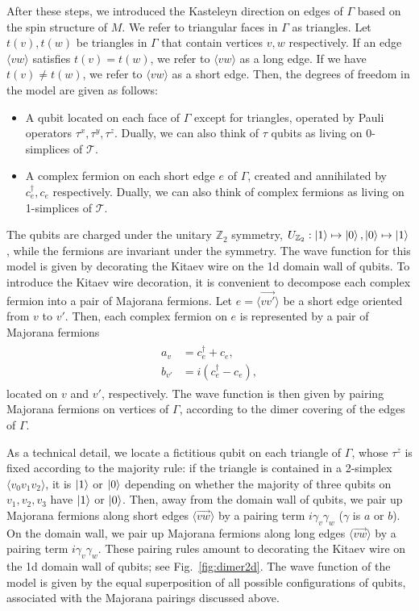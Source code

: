 \documentclass[12pt]{article}
\numberwithin{equation}{section}
\begin{document}
After these steps, we introduced the Kasteleyn direction on edges of $\Gamma$ based on the spin structure of $M$. We refer to triangular faces in $\Gamma$ as triangles. Let $t(v), t(w)$ be triangles in $\Gamma$ that contain vertices $v, w$ respectively. If an edge $\langle vw\rangle$ satisfies $t(v)=t(w)$, we refer to $\langle vw\rangle$ as a long edge. If we have $t(v)\neq t(w)$, we refer to $\langle vw\rangle$ as a short edge.
Then, the degrees of freedom in the model are given as follows:
\begin{itemize}
    \item A qubit located on each face of $\Gamma$ except for triangles, operated by Pauli operators $\tau^x, \tau^y, \tau^z$.
    Dually, we can also think of $\tau$ qubits as living on 0-simplices of $\mathcal{T}$.
    
    \item A complex fermion on each short edge $e$ of $\Gamma$, created and annihilated by $c^{\dagger}_e, c_e$ respectively.
    Dually, we can also think of complex fermions as living on 1-simplices of $\mathcal{T}$.
\end{itemize}
The qubits are charged under the unitary $\mathbb{Z}_2$ symmetry, $U_{\mathbb{Z}_2}: \ket{1}\mapsto\ket{0}, \ket{0}\mapsto\ket{1}$, while the fermions are invariant under the symmetry. 
The wave function for this model is given by decorating the Kitaev wire on the 1d domain wall of qubits. To introduce the Kitaev wire decoration, it is convenient to decompose each complex fermion into a pair of Majorana fermions. 
Let $e = \langle \overrightarrow{vv'}\rangle$ be a short edge oriented from $v$ to $v'$. Then, each complex fermion on $e$ is represented by a pair of Majorana fermions
\begin{align}
    \begin{split}
        a_{v} &= c_{e}^{\dagger}+c_{e}, \\
        b_{v'} &= i(c_{e}^{\dagger}-c_{e}),
    \end{split}
\end{align}
located on $v$ and $v'$, respectively. The wave function is then given by pairing Majorana fermions on vertices of $\Gamma$, according to the dimer covering of the edges of $\Gamma$. 

As a technical detail, we locate a fictitious qubit on each triangle of $\Gamma$, whose $\tau^z$ is fixed according to the majority rule: if the triangle is contained in a 2-simplex $\langle v_0v_1v_2\rangle$, it is $\ket{1}$ or $\ket{0}$ depending on whether the majority of three qubits on $v_1,v_2,v_3$ have $\ket{1}$ or $\ket{0}$.
Then, away from the domain wall of qubits, we pair up Majorana fermions along short edges $\langle \overrightarrow{vw}\rangle$ by a pairing term $i\gamma_v\gamma_w$ ($\gamma$ is $a$ or $b$). On the domain wall, we pair up Majorana fermions along long edges $\langle\overrightarrow{vw}\rangle$ by a pairing term $i\gamma_v\gamma_w$. These pairing rules amount to decorating the Kitaev wire on the 1d domain wall of qubits; see Fig.~\ref{fig:dimer2d}.
The wave function of the model is given by the equal superposition of all possible configurations of qubits, associated with the Majorana pairings discussed above.
\end{document}
